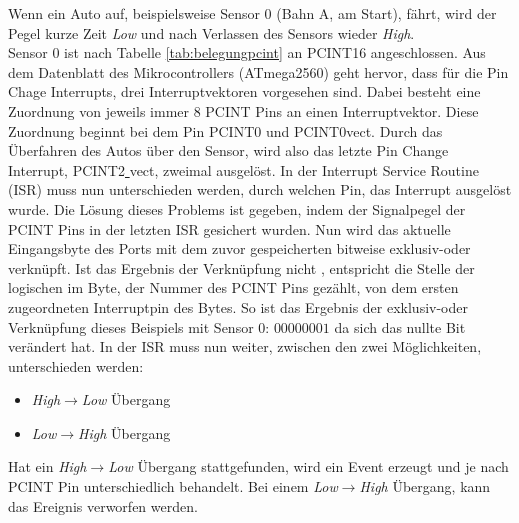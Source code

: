 \documentclass[a4paper, 11pt]{report}
\begin{document}
			Wenn ein Auto auf, beispielsweise Sensor 0 (Bahn A, am Start), fährt, wird der Pegel kurze Zeit \emph{Low} und nach Verlassen des Sensors wieder \emph{High}.\\ Sensor 0 ist nach Tabelle \ref{tab:belegungpcint} an PCINT16 angeschlossen. Aus dem Datenblatt des Mikrocontrollers (ATmega2560) geht hervor, dass für die Pin Chage Interrupts, drei Interruptvektoren vorgesehen sind. Dabei besteht eine Zuordnung von jeweils immer 8 PCINT Pins an einen Interruptvektor. Diese Zuordnung beginnt bei dem Pin PCINT0 und PCINT0\underline{}vect. Durch das Überfahren des Autos über den Sensor, wird also das letzte Pin Change Interrupt, PCINT2\underline{ }vect, zweimal ausgelöst. In der Interrupt Service Routine (ISR) muss nun unterschieden werden, durch welchen Pin, das Interrupt ausgelöst wurde.
			Die Lösung dieses Problems ist gegeben, indem der Signalpegel der PCINT Pins in der letzten ISR gesichert wurden. Nun wird das aktuelle Eingangsbyte des Ports mit dem zuvor gespeicherten bitweise exklusiv-oder verknüpft.
Ist das Ergebnis der Verknüpfung nicht \grqq, entspricht die Stelle der logischen \grqq im Byte, der Nummer des PCINT Pins gezählt, von dem ersten zugeordneten Interruptpin des Bytes. So ist das Ergebnis der exklusiv-oder Verknüpfung dieses Beispiels mit Sensor 0: $00000001$ da sich das nullte Bit verändert hat.
In der ISR muss nun weiter, zwischen den zwei Möglichkeiten, unterschieden werden:
				\begin{itemize}
					\item \emph{High$\rightarrow$Low} Übergang
					\item \emph{Low$\rightarrow$High} Übergang
				\end{itemize}
			Hat ein \emph{High$\rightarrow$Low} Übergang stattgefunden, wird ein Event erzeugt und je nach PCINT Pin unterschiedlich behandelt.
			Bei einem \emph{Low$\rightarrow$High} Übergang, kann das Ereignis verworfen werden.
\end{document}

